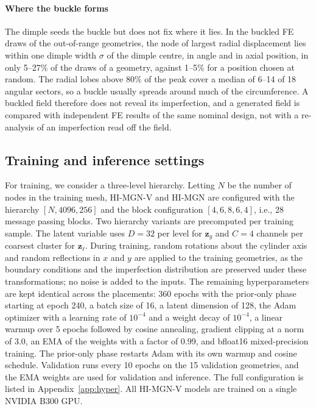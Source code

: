 \documentclass[preprint,12pt]{elsarticle}
\newcommand{\zg}{\mathbf{z}_{g}}
\newcommand{\zl}{\mathbf{z}_{\ell}}
\begin{document}
\paragraph{Where the buckle forms} The dimple seeds the buckle but does not fix where it lies. In
the buckled FE draws of the out-of-range geometries, the node of largest radial displacement lies
within one dimple width $\sigma$ of the dimple centre, in angle and in axial position, in only
5--27\% of the draws of a geometry, against 1--5\% for a position chosen at random. The radial
lobes above 80\% of the peak cover a median of 6--14 of 18 angular sectors, so a buckle usually
spreads around much of the circumference. A buckled field therefore does not reveal its
imperfection, and a generated field is compared with independent FE results of the same nominal
design, not with a re-analysis of an imperfection read off the field.

\subsection{Training and inference settings}\label{sec:setup}

For training, we consider a three-level hierarchy. Letting $N$ be the number of nodes in the
training mesh, HI-MGN-V and HI-MGN are configured with the hierarchy $[N, 4096, 256]$ and the block
configuration $[4, 6, 8, 6, 4]$, i.e., 28 message passing blocks. Two hierarchy variants are
precomputed per training sample. The latent variable uses $D=32$ per level for $\zg$ and $C=4$
channels per coarsest cluster for $\zl$. During training, random rotations about the cylinder
axis and random reflections in $x$ and $y$ are applied to the training geometries, as the
boundary conditions and the imperfection distribution are preserved under these
transformations; no noise is added to the inputs. The remaining hyperparameters are kept identical
across the placements: 360 epochs with the prior-only phase starting at epoch 240, a batch size of
16, a latent dimension of 128, the Adam optimizer with a learning rate of $10^{-4}$ and a weight
decay of $10^{-4}$, a linear warmup over 5 epochs followed by cosine annealing, gradient
clipping at a norm of 3.0, an EMA of the weights with a factor of 0.99, and bfloat16
mixed-precision training. The prior-only phase restarts Adam with its own warmup and cosine
schedule. Validation runs every 10 epochs on the 15 validation geometries, and the EMA weights are
used for validation and inference. The full configuration is listed in Appendix~\ref{app:hyper}.
All HI-MGN-V models are trained on a single NVIDIA B300 GPU.
\end{document}
